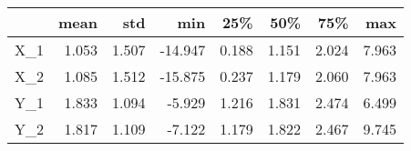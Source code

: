 \begin{tabular}{lrrrrrrr}
\toprule
{} &  mean &   std &     min &   25\% &   50\% &   75\% &   max \\
\midrule
X_1 & 1.053 & 1.507 & -14.947 & 0.188 & 1.151 & 2.024 & 7.963 \\
X_2 & 1.085 & 1.512 & -15.875 & 0.237 & 1.179 & 2.060 & 7.963 \\
Y_1 & 1.833 & 1.094 &  -5.929 & 1.216 & 1.831 & 2.474 & 6.499 \\
Y_2 & 1.817 & 1.109 &  -7.122 & 1.179 & 1.822 & 2.467 & 9.745 \\
\bottomrule
\end{tabular}